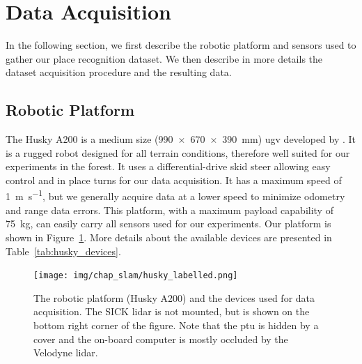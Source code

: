 \section{Data Acquisition}
\label{sec:chap_slam_data_acquisition}

In the following section, we first describe the robotic platform and sensors used to gather our place recognition dataset. We then describe in more details the dataset acquisition procedure and the resulting data.


\subsection{Robotic Platform}
\label{ssec:chap_slam_platform}

The Husky A200 is a medium size (\SI{990 x 670 x 390}{\milli\meter}) \gls*{ugv} developed by \cite{ClearpathWeb}. It is a rugged robot designed for all terrain conditions, therefore well suited for our experiments in the forest. It uses a differential-drive skid steer allowing easy control and in place turns for our data acquisition. It has a maximum speed of \SI{1}{\meter\per\second}, but we generally acquire data at a lower speed to minimize odometry and range data errors. This platform, with a maximum payload capability of \SI{75}{\kilo\gram}, can easily carry all sensors used for our experiments. Our platform is shown in Figure~\ref{fig:chap_slam_husky}. More details about the available devices are presented in Table~\ref{tab:husky_devices}.

\begin{figure}[H]
    \centering
    \texttt{[image: img/chap\_slam/husky\_labelled.png]}
    \caption[The robotic platform (Husky A200) and the devices used for data acquisition.]{The robotic platform (Husky A200) and the devices used for data acquisition. The SICK \gls*{lidar} is not mounted, but is shown on the bottom right corner of the figure. Note that the \gls*{ptu} is hidden by a cover and the on-board computer is mostly occluded by the Velodyne \gls*{lidar}.}
    \label{fig:chap_slam_husky}
\end{figure}

